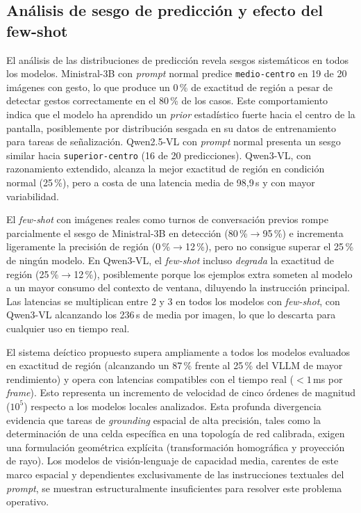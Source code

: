 \documentclass[12pt]{report} %
\begin{document}
\subsection{Análisis de sesgo de predicción y efecto del few-shot}

El análisis de las distribuciones de predicción revela sesgos sistemáticos en todos los modelos. Ministral-3B con \textit{prompt} normal predice \texttt{medio-centro} en 19 de 20 imágenes con gesto, lo que produce un 0\,\% de exactitud de región a pesar de detectar gestos correctamente en el 80\,\% de los casos. Este comportamiento indica que el modelo ha aprendido un \textit{prior} estadístico fuerte hacia el centro de la pantalla, posiblemente por distribución sesgada en su datos de entrenamiento para tareas de señalización. Qwen2.5-VL con \textit{prompt} normal presenta un sesgo similar hacia \texttt{superior-centro} (16 de 20 predicciones). Qwen3-VL, con razonamiento extendido, alcanza la mejor exactitud de región en condición normal (25\,\%), pero a costa de una latencia media de 98{,}9\,s y con mayor variabilidad.

El \textit{few-shot} con imágenes reales como turnos de conversación previos rompe parcialmente el sesgo de Ministral-3B en detección (80\,\%$\to$95\,\%) e incrementa ligeramente la precisión de región (0\,\%$\to$12\,\%), pero no consigue superar el 25\,\% de ningún modelo. En Qwen3-VL, el \textit{few-shot} incluso \emph{degrada} la exactitud de región (25\,\%$\to$12\,\%), posiblemente porque los ejemplos extra someten al modelo a un mayor consumo del contexto de ventana, diluyendo la instrucción principal. Las latencias se multiplican entre 2 y 3 en todos los modelos con \textit{few-shot}, con Qwen3-VL alcanzando los 236\,s de media por imagen, lo que lo descarta para cualquier uso en tiempo real.

El sistema deíctico propuesto supera ampliamente a todos los modelos evaluados en exactitud de región (alcanzando un 87\,\% frente al 25\,\% del VLLM de mayor rendimiento) y opera con latencias compatibles con el tiempo real ($<1$\,ms por \textit{frame}). Esto representa un incremento de velocidad de cinco órdenes de magnitud ($10^5$) respecto a los modelos locales analizados. Esta profunda divergencia evidencia que tareas de \textit{grounding} espacial de alta precisión, tales como la determinación de una celda específica en una topología de red calibrada, exigen una formulación geométrica explícita (transformación homográfica y proyección de rayo). Los modelos de visión-lenguaje de capacidad media, carentes de este marco espacial y dependientes exclusivamente de las instrucciones textuales del \textit{prompt}, se muestran estructuralmente insuficientes para resolver este problema operativo.
\end{document}
